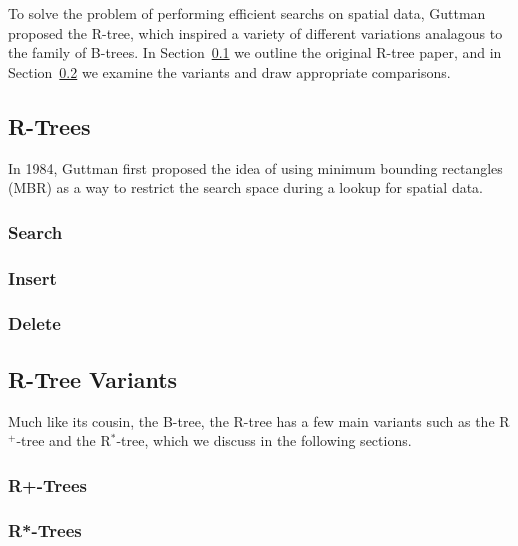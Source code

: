 To solve the problem of performing efficient searchs on spatial data, 
Guttman proposed the R-tree, which inspired a variety of different 
variations analagous to the family of B-trees. In Section~\ref{sec:rtrees}
we outline the original R-tree paper, and in Section~\ref{sec:variants}
we examine the variants and draw appropriate comparisons.

\subsection{R-Trees}
\label{sec:rtrees}
In 1984, Guttman first proposed the idea of using minimum bounding rectangles
(MBR) as a way to restrict the search space during a lookup for spatial data.


\subsubsection{Search}

\subsubsection{Insert}

\subsubsection{Delete}


\subsection{R-Tree Variants}
\label{sec:variants}
Much like its cousin, the B-tree, the R-tree has a few main variants such as
the R$^{+}$-tree and the R$^{*}$-tree, which we discuss in the following sections.

\subsubsection{R+-Trees}
\subsubsection{R*-Trees}


